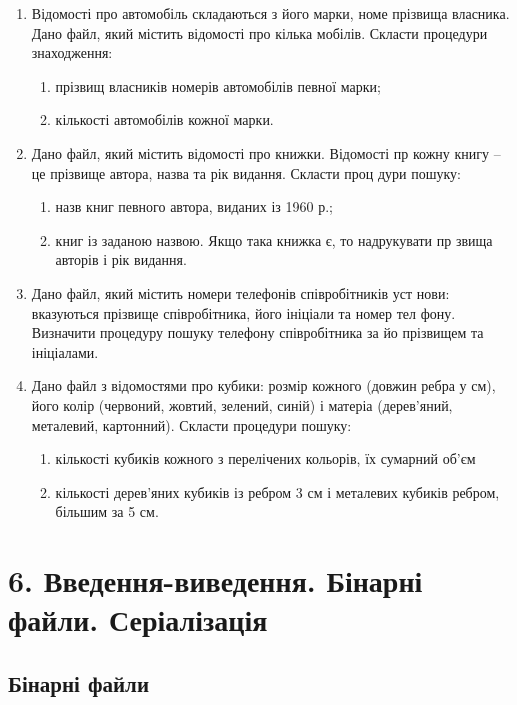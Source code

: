 \documentclass[]{article}
\makeatletter
\newcommand{\xslalph}[1]{\expandafter\@xslalph\csname c@#1\endcsname}
\newcommand{\@xslalph}[1]{%
    \ifcase#1\or а\or б\or в\or г\or д\or e\or є\or ж\or з\or i%
    \or й\or к\or л\or м\or н\or о\or п\or р\or с\or т%
    \or у\or ф\or х\or ц\or ч\or ш\or ю\or я\or аа\or бб\or вв %
    \else\@ctrerr\fi%
}
\makeatother
\begin{document}
\begin{enumerate}
\item  Відомості про автомобіль складаються  з його марки, номе
прізвища власника. Дано файл, який містить відомості про кілька 
мобілів. Скласти процедури знаходження: 
\begin{enumerate}[label=\xslalph*)]
\item
 прізвищ власників номерів автомобілів певної марки; 
\item кількості автомобілів кожної марки.
\end{enumerate}
\item  Дано файл,  який  містить  відомості  про  книжки.  Відомості  пр
кожну книгу – це прізвище автора, назва та рік видання. Скласти проц
дури пошуку: 
\begin{enumerate}[label=\xslalph*)]
\item назв книг певного автора, виданих із 1960 р.; 
\item книг  із заданою назвою. Якщо така книжка є, то надрукувати пр
звища авторів і рік видання. 
\end{enumerate}

\item  Дано файл, який містить номери телефонів співробітників уст
нови:  вказуються  прізвище  співробітника,  його  ініціали  та  номер  тел
фону.  Визначити  процедуру  пошуку  телефону  співробітника  за  йо
прізвищем та ініціалами. 


\item  Дано файл з відомостями про кубики: розмір кожного (довжин
ребра  у  см),  його  колір (червоний,  жовтий,  зелений,  синій)  і  матеріа
(дерев'яний, металевий, картонний). Скласти процедури пошуку: 
\begin{enumerate}[label=\xslalph*)]
\item кількості кубиків кожного з перелічених кольорів, їх сумарний об'єм
\item кількості дерев'яних кубиків  із ребром 3 см  і металевих кубиків 
ребром, більшим за 5 см.
\end{enumerate}
\end{enumerate}

\section{6. Введення-виведення. Бінарні файли. Серіалізація}
 \subsection{Бінарні файли}
\end{document}
